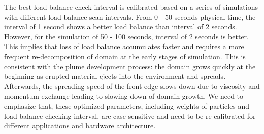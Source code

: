 The best load balance check interval is calibrated based on a series of simulations with different load balance scan intervals. From 0 - 50 seconds physical time, the interval of 1 second shows a better load balance than interval of 2 seconds. However, for the simulation of 50 - 100 seconds, interval of 2 seconds is better. This implies that loss of load balance accumulates faster and requires a more frequent re-decomposition of domain at the early stages of simulation. This is consistent with the plume development process: the domain grows quickly at the beginning as erupted material ejects into the environment and spreads. Afterwards, the spreading speed of the front edge slows down due to viscosity and momentum exchange leading to slowing down of domain growth. We need to emphasize that, these optimized parameters, including weights of particles and load balance checking interval, are case sensitive and need to be re-calibrated for different applications and hardware architecture.

